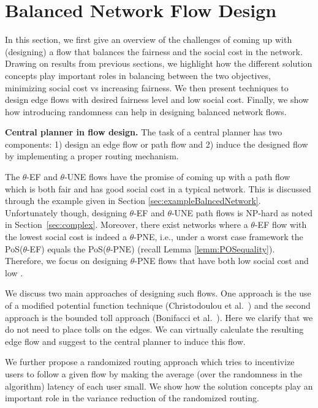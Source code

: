 \section{Balanced Network Flow Design}\label{sec:design}
In this section, we first give an overview of the challenges of coming up with (designing) a flow that balances %
 the fairness and the social cost in the network. Drawing on results from previous sections, we highlight how the different solution concepts play important roles in balancing between the two objectives, minimizing social cost vs increasing fairness. We then present techniques to design edge flows with desired fairness level and low social cost. Finally, we show how introducing randomness can help in designing balanced network flows. 
 

\smallskip\noindent\textbf{Central planner in flow design.} The task of a central planner has two components: 1) design an edge flow or path flow and 2) induce the designed flow by implementing a proper routing mechanism. 
 
The $\theta$-EF and $\theta$-UNE flows have the promise of coming up with a path flow which is both fair and has good social cost in a typical network. This is discussed through the example given in Section \ref{sec:exampleBalncedNetwork}. Unfortunately though, designing $\theta$-EF and $\theta$-UNE path flows is NP-hard as noted in  Section~\ref{sec:complex}. Moreover, there exist networks where  a $\theta$-EF flow with the lowest social cost is indeed a $\theta$-PNE, i.e.,  under a worst case framework the PoS($\theta$-EF) equals the PoS($\theta$-PNE) (recall Lemma \ref{lemm:POSequality}). Therefore, we focus on designing $\theta$-PNE flows that have both low social cost and low {\efu}. 
 
We discuss two main approaches of designing  such %
flows. One approach is the use of a modified potential function technique (Christodoulou et al.~\cite{christodoulou2011performance}) and the second approach is the bounded toll approach (Bonifacci et al.~\cite{bonifaci2011efficiency}). Here we clarify that we do not need to place tolls on the edges. We can virtually calculate the resulting edge flow and suggest to the central planner to induce this flow.

We further propose a randomized routing approach which tries to incentivize users to follow a given flow by making the average (over the randomness in the algorithm) latency of each user small. We show how the solution concepts play an important role in the variance reduction of the randomized routing. 

